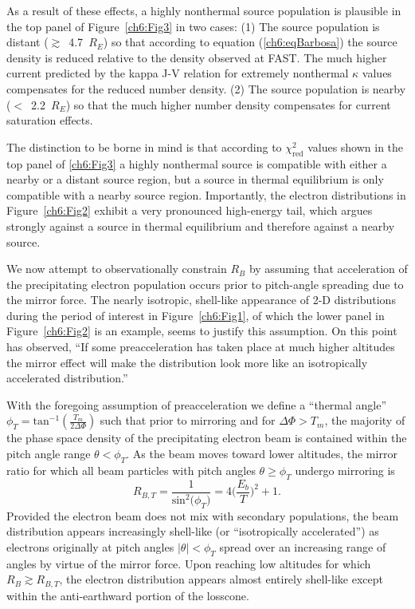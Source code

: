   As a result of these effects, a highly nonthermal source population is
  plausible in the top panel of Figure~\ref{ch6:Fig3} in two cases: (1) The
  source population is distant ($\gtrsim$~4.7~$R_E$) so that according to
  equation (\ref{ch6:eqBarbosa}) the source density is reduced relative to the
  density observed at FAST. The much higher current predicted by the kappa J-V
  relation for extremely nonthermal $\kappa$ values compensates for the reduced
  number density. (2) The source population is nearby ($<$~2.2~$R_E$) so that
  the much higher number density compensates for current saturation effects.

  The distinction to be borne in mind is that according to
  $\chi^2_{\mathrm{red}}$ values shown in the top panel of \ref{ch6:Fig3} a
  highly nonthermal source is compatible with either a nearby or a distant
  source region, but a source in thermal equilibrium is only compatible with a
  nearby source region. Importantly, the electron distributions in
  Figure~\ref{ch6:Fig2} exhibit a very pronounced high-energy tail, which argues
  strongly against a source in thermal equilibrium and therefore against a
  nearby source. 

  We now attempt to observationally constrain $R_B$ by assuming that
  acceleration of the precipitating electron population occurs prior to
  pitch-angle spreading due to the mirror force. The nearly isotropic,
  shell-like appearance of 2-D distributions during the period of interest in
  Figure~\ref{ch6:Fig1}, of which the lower panel in Figure~\ref{ch6:Fig2} is an
  example, seems to justify this assumption. On this point \citet{Bostrom2003a}
  has observed, ``If some preacceleration has taken place at much higher
  altitudes the mirror effect will make the distribution look more like an
  isotropically accelerated distribution.''

  With the foregoing assumption of preacceleration we define a ``thermal angle''
  $\phi_T = \textrm{tan}^{-1} ( \frac{T_m}{2 \Delta \Phi} )$ such that prior to
  mirroring and for $\Delta \Phi > T_m$, the majority of the phase space density
  of the precipitating electron beam is contained within the pitch angle range $
  \theta < \phi_T$. As the beam moves toward lower altitudes, the mirror ratio
  for which all beam particles with pitch angles $\theta \geq \phi_T$ undergo
  mirroring is
  \begin{equation} \label{ch6:RBTherm} R_{B,T} = \dfrac{1}{\mathrm{sin}^2 \big
      (\phi_T \big ) } = 4 \Big ( \dfrac{E_b}{T} \Big )^2 + 1.
  \end{equation}
  Provided the electron beam does not mix with secondary populations, the beam
  distribution appears increasingly shell-like (or ``isotropically
  accelerated'') as electrons originally at pitch angles $\vert \theta \vert <
  \phi_T$ spread over an increasing range of angles by virtue of the mirror
  force. Upon reaching low altitudes for which $R_B \gtrsim R_{B,T}$, the
  electron distribution appears almost entirely shell-like except within the
  anti-earthward portion of the losscone.

